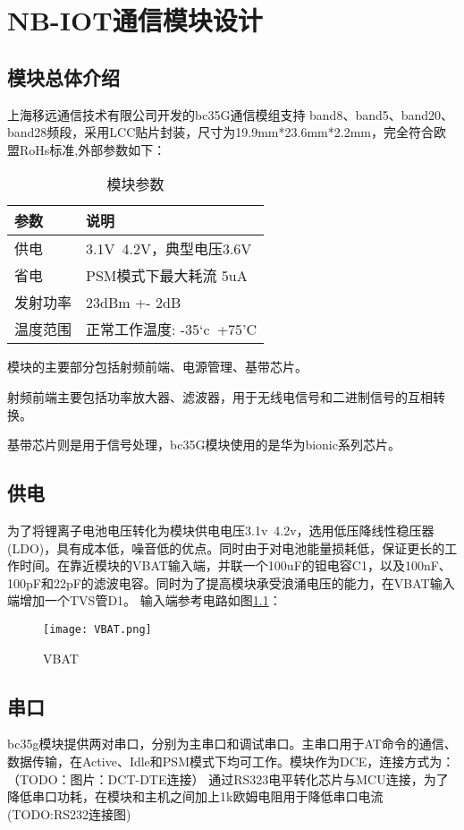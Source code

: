 
\chapter{NB-IOT通信模块设计}
\section{模块总体介绍}

上海移远通信技术有限公司开发的bc35G通信模组支持 band8、band5、band20、band28频段，采用LCC贴片封装，尺寸为19.9mm*23.6mm*2.2mm，完全符合欧盟RoHs标准\cite{RoHs},外部参数如下：

\begin{table}[h!]
\caption{模块参数}
\begin{tabular}{ll}
\toprule
参数&说明\\
\midrule
供电&3.1V~4.2V，典型电压3.6V\\
省电&PSM模式下最大耗流 5uA\\
发射功率&23dBm +- 2dB\\
温度范围&正常工作温度: -35‘c~+75'C\\
\bottomrule
\end{tabular}
\label{模块参数}
\end{table}

模块的主要部分包括射频前端、电源管理、基带芯片。

射频前端主要包括功率放大器、滤波器，用于无线电信号和二进制信号的互相转换。

基带芯片则是用于信号处理，bc35G模块使用的是华为bionic系列芯片。


\section{供电}
为了将锂离子电池电压转化为模块供电电压3.1v~4.2v，选用低压降线性稳压器(LDO)，具有成本低，噪音低的优点。同时由于对电池能量损耗低，保证更长的工作时间。在靠近模块的VBAT输入端，并联一个100uF的钽电容C1，以及100nF、100pF和22pF的滤波电容。同时为了提高模块承受浪涌电压的能力，在VBAT输入端增加一个TVS管D1。
输入端参考电路如图\ref{VBAT}：
\begin{figure}[H]
	\centering
	\texttt{[image: VBAT.png]}
	\caption{VBAT}
	\label{VBAT}
\end{figure}

\section{串口}
bc35g模块提供两对串口，分别为主串口和调试串口。主串口用于AT命令的通信、数据传输，在Active、Idle和PSM模式下均可工作。模块作为DCE，连接方式为：（TODO：图片：DCT-DTE连接）
通过RS323电平转化芯片与MCU连接，为了降低串口功耗，在模块和主机之间加上1k欧姆电阻用于降低串口电流(TODO:RS232连接图)

